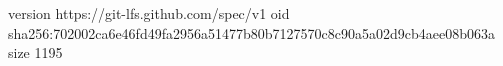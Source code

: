 version https://git-lfs.github.com/spec/v1
oid sha256:702002ca6e46fd49fa2956a51477b80b7127570c8c90a5a02d9cb4aee08b063a
size 1195
